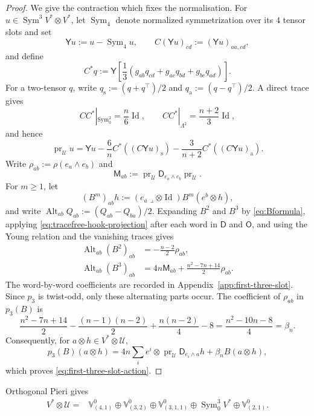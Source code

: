 \documentclass[reqno,11pt]{amsart}
\theoremstyle{definition}
\newcommand{\Sym}{\operatorname{Sym}}
\newcommand{\Id}{\operatorname{Id}}
\newcommand{\cU}{\mathcal U}
\begin{document}
\begin{proof}
We give the contraction which fixes the normalisation. For
$u\in\Sym^3V^*\otimes V^*$, let $\Sym_4$ denote normalized symmetrization
over its $4$ tensor slots and set
$$
  \mathsf Yu:=u-\Sym_4u,
  \qquad C(\mathsf Yu)_{cd}:=(\mathsf Yu)_{aa,cd},
$$
and define
$$
  C^*q:=\mathsf Y\!\left[\frac13
  (g_{ab}q_{cd}+g_{ac}q_{bd}+g_{bc}q_{ad})\right].
$$
For a two-tensor $q$, write
$q_{\mathrm s}:=(q+q^\top)/2$ and $q_{\mathrm a}:=(q-q^\top)/2$.
A direct trace gives
$$
  CC^*|_{\Sym^2_0}=\frac n6\Id,
  \qquad
  CC^*|_{\Lambda^2}=\frac{n+2}{3}\Id,
$$
and hence
\begin{equation}\label{eq:tracefree-hook-projection}
  \operatorname{pr}_{\cU}u
  =\mathsf Yu-\frac6nC^*((C\mathsf Yu)_{\mathrm s})
     -\frac3{n+2}C^*((C\mathsf Yu)_{\mathrm a}).
\end{equation}
Write $\rho_{ab}:=\rho(e_a\wedge e_b)$ and
$$
  \mathsf M_{ab}:=\operatorname{pr}_{\cU}\mathsf D_{e_a\wedge e_b}
                  \operatorname{pr}_{\cU}.
$$
For $m\geq1$, let
$$
  (B^m)_{ab}h
  :=(e_a\mathbin{\lrcorner}\otimes\Id)B^m(e^b\otimes h),
$$
and write $\operatorname{Alt}_{ab}Q_{ab}:=(Q_{ab}-Q_{ba})/2$.
Expanding $B^2$ and $B^3$ by \eqref{eq:Bformula}, applying
\eqref{eq:tracefree-hook-projection} after each word in $\mathsf D$ and
$\mathsf O$, and using the Young relation and the vanishing traces gives
\begin{align}
 \operatorname{Alt}_{ab}(B^2)_{ab}
   &=-\frac{n-2}{2}\rho_{ab},\label{eq:alt-B2}\\
 \operatorname{Alt}_{ab}(B^3)_{ab}
   &=4n\mathsf M_{ab}+\frac{n^2-7n+14}{2}\rho_{ab}.
   \label{eq:alt-B3}
\end{align}
The word-by-word coefficients are recorded in
Appendix~\ref{app:first-three-slot}. Since $p_3$ is twist-odd, only these alternating
parts occur. The coefficient of $\rho_{ab}$ in $p_3(B)$ is
$$
 \frac{n^2-7n+14}{2}
 -\frac{(n-1)(n-2)}2+\frac{n(n-2)}4-8
 =\frac{n^2-10n-8}{4}=\beta_n.
$$
Consequently, for $a\otimes h\in V^*\otimes\cU$,
$$
  p_3(B)(a\otimes h)
  =4n\sum_i e^i\otimes\operatorname{pr}_{\cU}
       \mathsf D_{e_i\wedge a}h+\beta_nB(a\otimes h),
$$
which proves \eqref{eq:first-three-slot-action}.
\end{proof}

Orthogonal Pieri gives
\begin{equation}\label{eq:Vtensor-tracefree-hook}
\begin{split}
 V^*\otimes\cU={}&
 \mathbb V^0_{(4,1)}\oplus\mathbb V^0_{(3,2)}
 \oplus\mathbb V^0_{(3,1,1)}\oplus\Sym^3_0V^*\oplus\mathbb V^0_{(2,1)}.
\end{split}
\end{equation}
\end{document}
